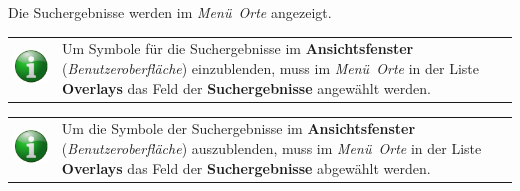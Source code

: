 \documentclass[10pt]{scrreprt}
\newcommand{\textref}[1]{\mbox{\raisebox{0.1ex}{\small$\rightarrow$ }\textit{#1}}}
\begin{document}
\vspace{3mm}
Die Suchergebnisse werden im \textref{Menü Orte} angezeigt.

\vspace{3mm}
\begin{tabular}{>{\centering \arraybackslash}m{1cm} m{14cm}} \index{Overlays}
\includegraphics[scale=0.5]{images/info.eps} & Um Symbole für die Suchergebnisse im \textbf{Ansichtsfenster} (\textref{Benutzeroberfläche}) einzublenden, muss im \textref{Menü Orte} in der Liste \textbf{Overlays} das Feld der \textbf{Suchergebnisse} angewählt werden.
\end{tabular}

\vspace{3mm}
\begin{tabular}{>{\centering \arraybackslash}m{1cm} m{14cm}} \index{Overlays}
\includegraphics[scale=0.5]{images/info.eps} & Um die Symbole der Suchergebnisse im \textbf{Ansichtsfenster} (\textref{Benutzeroberfläche}) auszublenden, muss im \textref{Menü Orte} in der Liste \textbf{Overlays} das Feld der \textbf{Suchergebnisse} abgewählt werden.
\end{tabular}
\end{document}
